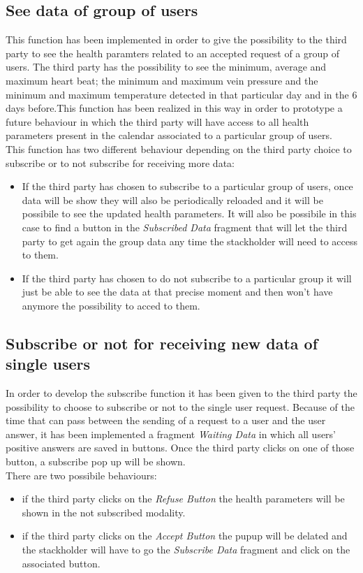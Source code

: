 \subsection{See data of group of users}
This function has been implemented in order to give the possibility to the third party to see the health paramters related to an accepted request of a group of users. The third party has the possibility to see the minimum, average and maximum heart beat; the minimum and maximum vein pressure and the minimum and maximum temperature detected in that particular day and in the 6 days before.This function has been realized in this way in order to prototype a future behaviour in which the third party will have access to all health parameters present in the calendar associated to a particular group of users.\\
This function has two different behaviour depending on the third party choice to subscribe or to not subscribe for receiving more data:
\begin{itemize}
	\item If the third party has chosen to subscribe to a particular group of users, once data will be show they will also be 				periodically reloaded and it will be possibile to see the updated health parameters. It will also be possibile in this case to find a 			button in the \textit{Subscribed Data} fragment that will let the third party to get again the group data any time the 				stackholder will need to access to them.
	\item If the third party has chosen to do not subscribe to a particular group it will just be able to see the data at that precise 			moment and then won't have anymore the possibility to acced to them.
\end{itemize}


\subsection{Subscribe or not for receiving new data of single users}
In order to develop the subscribe function it has been given to the third party the possibility to choose to subscribe or not to the single user request. Because of the time that can pass between the sending of a request to a user and the user answer, it has been implemented a fragment \textit{Waiting Data} in which all  users' positive answers are saved in buttons. Once the third party clicks on one of those button, a subscribe pop up will be shown. \\
There are two possibile behaviours:
\begin{itemize}
	\item if the third party clicks on the\textit{ Refuse Button} the health parameters will be shown in the not subscribed modality.
	\item if the third party clicks on the \textit{Accept Button} the pupup will be delated and the stackholder will have to go the 			\textit{Subscribe Data} fragment and click on the associated button.
\end{itemize}



